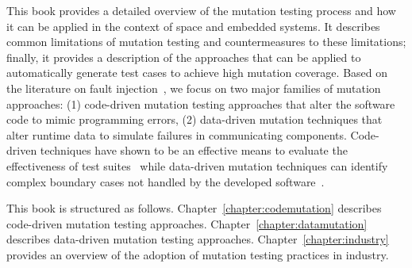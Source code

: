 This book provides a detailed overview of  the mutation testing process and how it can be applied in the context of space and embedded systems. It describes common limitations of mutation testing and countermeasures to these limitations; finally, it provides a description of the approaches that can be applied to automatically generate test cases to achieve high mutation coverage.
Based on the literature on fault injection~\cite{natella2016assessing}, we focus on two major families of mutation approaches: (1) code-driven mutation testing approaches that alter the software code to mimic programming errors, (2) data-driven mutation techniques that alter runtime data to simulate failures in communicating components. Code-driven techniques have shown to be an effective means to evaluate the effectiveness of test suites~\cite{Andrews06} while data-driven mutation techniques can identify complex boundary cases not handled by the developed software~\cite{di2015evolutionary}.

This book is structured as follows. 
Chapter~\ref{chapter:codemutation} describes code-driven mutation testing approaches. 
Chapter~\ref{chapter:datamutation} describes data-driven mutation testing approaches.
Chapter~\ref{chapter:industry} provides an overview of the adoption of mutation testing practices in industry.